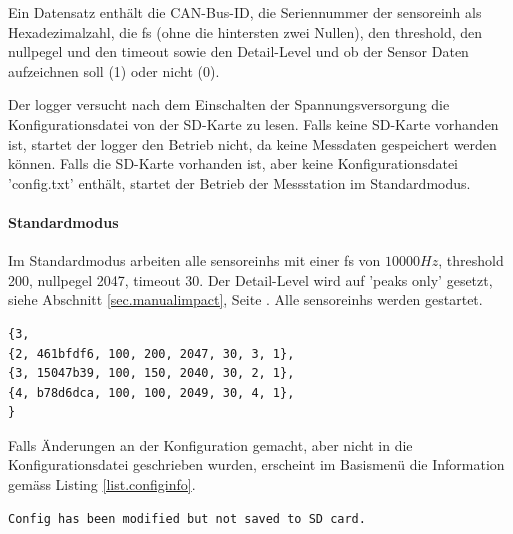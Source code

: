 Ein Datensatz enthält die CAN-Bus-ID, die Seriennummer der \gls{sensoreinh} als Hexadezimalzahl, die \gls{fs} (ohne die hintersten zwei Nullen), den \gls{threshold}, den \gls{nullpegel} und den \gls{timeout} sowie den Detail-Level und ob der Sensor Daten aufzeichnen soll (1) oder nicht (0).

Der \gls{logger} versucht nach dem Einschalten der Spannungsversorgung die Konfigurationsdatei von der SD-Karte zu lesen. Falls keine SD-Karte vorhanden ist, startet der \gls{logger} den Betrieb nicht, da keine Messdaten gespeichert werden können. Falls die SD-Karte vorhanden ist, aber keine Konfigurationsdatei 'config.txt' enthält, startet der Betrieb der Messstation im Standardmodus.

\paragraph{Standardmodus} Im Standardmodus arbeiten alle \glspl{sensoreinh} mit einer \gls{fs} von \ensuremath{10000 Hz}, \gls{threshold} 200, \gls{nullpegel} 2047, \gls{timeout} 30. Der Detail-Level wird auf 'peaks only' gesetzt, siehe Abschnitt \ref{sec.manualimpact}, Seite \pageref{sec.manualimpact}. Alle \glspl{sensoreinh} werden gestartet.

\begin{lstlisting}[caption=Beispiel einer Konfigurationsdatei, label=list.configfile]
{3,
{2, 461bfdf6, 100, 200, 2047, 30, 3, 1},
{3, 15047b39, 100, 150, 2040, 30, 2, 1},
{4, b78d6dca, 100, 100, 2049, 30, 4, 1},
}
\end{lstlisting}

Falls Änderungen an der Konfiguration gemacht, aber nicht in die Konfigurationsdatei geschrieben wurden, erscheint im Basismenü die Information gemäss Listing \ref{list.configinfo}.

\begin{lstlisting}[caption=Information bei ungespeicherter Konfiguration, label=list.configinfo]
Config has been modified but not saved to SD card.
\end{lstlisting}

